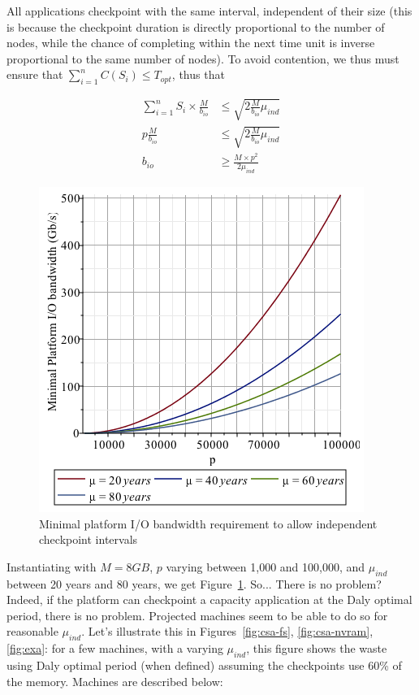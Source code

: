 \documentclass{article}
\begin{document}
All applications checkpoint with the same interval, independent of their size (this is because the checkpoint duration is directly proportional to the number of nodes, while the chance of completing within the next time unit is inverse proportional to the same number of nodes).  To avoid contention, we thus must ensure that $\sum_{i = 1}^{n} C(S_i) \leq T_{opt}$, thus that

$$\begin{array}{rl}
\sum_{i = 1}^{n} S_i\times \frac{M}{b_{io}} & \leq \sqrt{2\frac{M}{b_{io}}\mu_{ind}}\\
p\frac{M}{b_{io}} & \leq \sqrt{2\frac{M}{b_{io}}\mu_{ind}}\\
b_{io} & \geq \frac{M\times p^2}{2\mu_{ind}}
\end{array}$$

\begin{figure}[h!]
  \begin{center}
    \includegraphics[width=.6\linewidth]{biomin.png}
  \end{center}
  \caption{Minimal platform I/O bandwidth requirement to allow independent checkpoint intervals\label{fig:minio}}
\end{figure}
 
Instantiating with $M = 8GB$, $p$ varying between 1,000 and 100,000, and $\mu_{ind}$ between 20 years and 80 years, we get Figure~\ref{fig:minio}. So... There is no problem? Indeed, if the platform can checkpoint a capacity application at the Daly optimal period, there is no problem. Projected machines seem to be able to do so for reasonable $\mu_{ind}$. Let's illustrate this in Figures~\ref{fig:csa-fs}, \ref{fig:csa-nvram}, \ref{fig:exa}: for a few machines, with a varying $\mu_{ind}$, this figure shows the waste using Daly optimal period (when defined) assuming the checkpoints use 60\% of the memory. Machines are described below:
\end{document}
